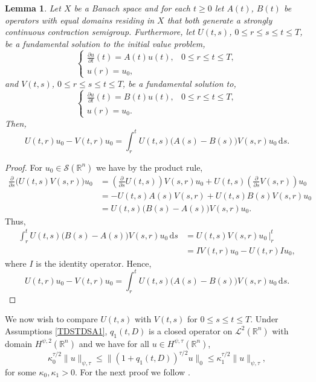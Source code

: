 \documentclass[a4paper, 12pt]{report}
\newtheorem{lemma}[theorem]{Lemma}
\theoremstyle{remark}
\theoremstyle{definition}
\begin{document}
\begin{lemma}\label{TDSTDSL1}
Let $X$ be a Banach space and for each $t \ge 0$ let $A(t)$, $B(t)$ be operators with equal domains residing in $X$ that both generate a strongly continuous contraction semigroup.  Furthermore, let $U(t, s)$, $0 \le r \le s \le t \le T$, be a fundamental solution to the initial value problem,
$$
\begin{cases}
\frac{\partial u}{\partial t}(t) = A(t)u(t), & 0 \le r \le t \le T,\\
u(r) = u_0,
\end{cases}
$$
and $V(t, s)$, $0 \le r \le s \le t \le T$, be a fundamental solution to,
$$
\begin{cases}
\frac{\partial u}{\partial t}(t) = B(t)u(t), & 0 \le r \le t \le T,\\
u(r) = u_0.
\end{cases}
$$
Then,
$$
U(t, r)u_0 - V(t, r)u_0 = \int_r^tU(t, s)\big(A(s) - B(s)\big)V(s, r)u_0\,\mathrm{d}s.
$$
\end{lemma}
\begin{proof}
For $u_0 \in \mathcal{S}(\mathbb{R}^n)$ we have by the product rule,
$$
\begin{aligned}
\frac{\partial}{\partial s}\big(U(t, s)V(s, r)\big)u_0 & = \left(\frac{\partial}{\partial s}U(t, s)\right)V(s, r)u_0 + U(t, s)\left(\frac{\partial}{\partial s}V(s, r)\right)u_0\\
& = -U(t, s)A(s)V(s, r) + U(t, s)B(s)V(s, r)u_0\\
& = U(t, s)\big(B(s) - A(s)\big)V(s, r)u_0.
\end{aligned}
$$
Thus,
$$
\begin{aligned}
\int_r^tU(t, s)\big(B(s) - A(s)\big)V(s, r)u_0\,\mathrm{d}s & = U(t, s)V(s, r)u_0\,\bigg|_r^t\\
& = IV(t, r)u_0 - U(t, r)Iu_0,
\end{aligned}
$$
where $I$ is the identity operator.  Hence,
$$
U(t, r)u_0 - V(t, r)u_0 = \int_r^tU(t, s)\big(A(s) - B(s)\big)V(s, r)u_0\,\mathrm{d}s.
$$
\end{proof}

We now wish to compare $U(t, s)$ with $V(t, s)$ for $0 \le s \le t \le T$.  Under Assumptions \ref{TDSTDSA1}, $q_1(t, D)$ is a closed operator on $\mathcal{L}^2(\mathbb{R}^n)$ with domain $H^{\psi, 2}(\mathbb{R}^n)$ and we have for all $u \in H^{\psi, \tau}(\mathbb{R}^n)$,
\begin{equation}
\kappa_0^{\tau/2}\|u\|_{\psi, \tau} \le \|(1 + q_1(t, D))^{\tau/2} u\|_0 \le \kappa_1^{\tau/2}\|u\|_{\psi, \tau},
\end{equation}
for some $\kappa_0, \kappa_1 > 0$.  For the next proof we follow \cite[Theorem 3.1]{EstimatesPaper}.
\end{document}

